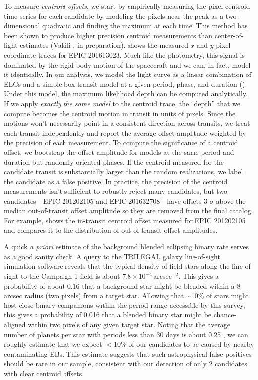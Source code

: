 To measure \emph{centroid offsets}, we start by empirically measuring the
pixel centroid time series for each candidate by modeling the pixels near the
peak as a two-dimensional quadratic and finding the maximum at each time.
This method has been shown to produce higher precision centroid measurements
than center-of-light estimates (Vakili \etal, in preparation).
 shows the measured $x$ and $y$ pixel coordinate traces for EPIC
201613023.
Much like the photometry, this signal is dominated by the rigid body motion
of the spacecraft and we can, in fact, model it identically.
In our analysis, we model the light curve as a linear
combination of ELCs and a simple box transit model at a given period, phase,
and duration ().
Under this model, the maximum likelihood depth can be computed analytically.
If we apply \emph{exactly the same model} to the centroid trace, the ``depth''
that we compute becomes the centroid motion in transit in units of pixels.
Since the motions won't necessarily point in a consistent direction across
transits, we treat each transit independently and report the average offset
amplitude weighted by the precision of each measurement.
To compute the significance of a centroid offset, we bootstrap the offset
amplitude for models at the same period and duration but randomly oriented
phases.
If the centroid measured for the candidate transit is substantially larger
than the random realizations, we label the candidate as a false positive.
In practice, the precision of the centroid measurements isn't sufficient to
robustly reject many candidates, but two candidates---EPIC 201202105 and EPIC
201632708---have offsets 3-$\sigma$ above the median out-of-transit offset
amplitude so they are removed from the final catalog.
For example,  shows the in-transit centroid offset measured for
EPIC 201202105 and compares it to the distribution of out-of-transit offset
amplitudes.

A quick \emph{a priori} estimate of the background blended eclipsing
binary rate serves as a good sanity check.  A query to the TRILEGAL
\citep[TRIdimensional modeL of thE GALaxy,][]{Girardi:2005} galaxy
line-of-sight simulation software reveals that the typical density of
field stars along the line of sight to the Campaign 1 field is about
$7.8\times 10^{-4}$\,arcsec$^{-2}$.  This gives a probability of about
0.16 that a background star might be blended within a 8\,arcsec radius
(two pixels) from a target star.  Allowing that $\sim$10\% of stars
might host close binary companions within the period range accessible
by this survey, this gives a probability of 0.016 that a blended
binary star might be chance-aligned within two pixels of any given
target star.  Noting that the average number of planets per star with
periods less than 30 days is about 0.25 \citep{Fressin:2013}, we can
roughly estimate that we expect $<$10\% of our candidates to be caused
by nearby contaminating EBs.  This estimate suggests that such
astrophysical false positives should be rare in our sample, consistent
with our detection of only 2 candidates with clear centroid offsets.

